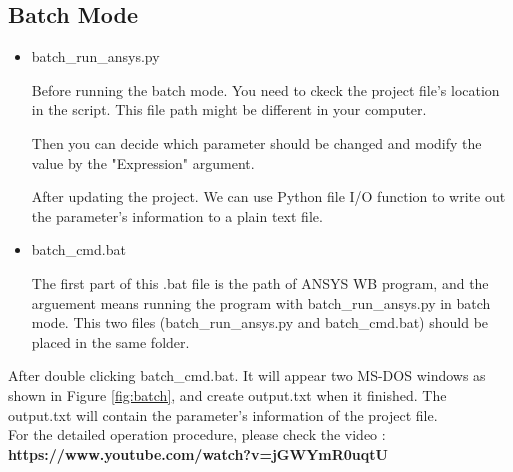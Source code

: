 \documentclass[12pt]{kjleehw}
\begin{document}
\begin{CJK}{UTF8}{bkai}
\subsection{Batch Mode}

\begin{itemize}
  \item batch\_run\_ansys.py

Before running the batch mode. You need to ckeck the project file's location in the script. This file path might be different in your computer.



Then you can decide which parameter should be changed and modify the value by the "Expression" argument.



After updating the project. We can use Python file I/O function to write out the parameter's information to a plain text file.



\end{itemize}

\begin{itemize}
  \item batch\_cmd.bat
  

  The first part of this .bat file is the path of ANSYS WB program, and the arguement means running the program with batch\_run\_ansys.py in batch mode. This two files (batch\_run\_ansys.py and batch\_cmd.bat) should be placed in the same folder.
\end{itemize}

After double clicking batch\_cmd.bat. It will appear two MS-DOS windows as shown in Figure \ref{fig:batch}, and create output.txt when it finished. The output.txt will contain the parameter's information of the project file. \\

For the detailed operation procedure, please check the video : \\
\textbf{https://www.youtube.com/watch?v=jGWYmR0uqtU}


\end{CJK}
\end{document}
